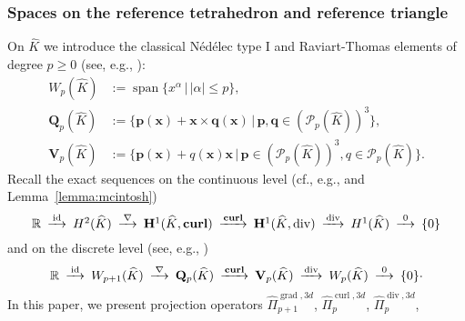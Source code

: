 \documentclass{article}
\newcommand{\hatPicurlcom}{\widehat \Pi^{\operatorname*{curl},3d}_p}
\newcommand{\hatPigradcom}{\widehat\Pi^{\operatorname*{grad},3d}_{p+1}}
\newcommand{\hatPidivcom}{\widehat\Pi^{\operatorname*{div},3d}_{p}}
\begin{document}
\subsubsection{Spaces on the reference tetrahedron and reference triangle}
On $\widehat{K}$ we introduce the classical
N\'{e}d\'{e}lec type I and Raviart-Thomas elements of degree $p\geq0$ (see,
e.g., \cite{Monkbook,hiptmair-acta,nedelec80}):
\begin{align}
W_{p}(\widehat{K}) &  :=\operatorname*{span}\{x^{\alpha
}\,|\,|\alpha|\leq p\},\label{eq:RTp}\\
\mathbf{Q}_{p}(\widehat{K}) &
:=\{\mathbf{p}(\mathbf{x})+\mathbf{x}\times\mathbf{q}(\mathbf{x})\,|\,\mathbf{p},\mathbf{q}%
\in({\mathcal{P}}_{p}(\widehat{K}))^{3}\},\\
\mathbf{V}_{p}(\widehat{K}) &  :=\{\mathbf{p}(\mathbf{x})+{q}(\mathbf{x})\mathbf{x}\,|\,\mathbf{p}%
\in({\mathcal{P}}_{p}(\widehat{K}))^{3},{q}\in{\mathcal{P}}_{p}(\widehat{K}%
)\}.
\end{align}
Recall the exact sequences on the continuous level
(cf., e.g., \cite{costabel-mcintosh10} and Lemma~\ref{lemma:mcintosh})
\begin{align}
\minCDarrowwidth15pt
\begin{CD} \mathbb{R} @> \operatorname*{id} >> H^2(\widehat K) @> \nabla >> \mathbf{H}^1(\widehat K, \operatorname*{\mathbf{curl}}) @> \operatorname*{\mathbf{curl}} >> \mathbf{H}^1(\widehat K, \operatorname*{div}) @> \operatorname*{div} >> H^1(\widehat K) @> \operatorname*{0} >> \{0\} \end{CD}
\end{align}
and on the discrete level (see, e.g., \cite[(57)]{demkowicz08})
\begin{align}
\minCDarrowwidth15pt
\begin{CD} \mathbb{R} @> \operatorname*{id} >> W_{p+1}(\widehat{K}) @> \nabla >> \mathbf{Q}_{p}(\widehat{K}) @> \operatorname*{\mathbf{curl}} >> \mathbf{V}_{p}(\widehat{K}) @> \operatorname*{div} >> W_{p}(\widehat{K}) @> \operatorname*{0} >> \{0\} \end{CD}.
\end{align}
In this paper, we present projection operators $\hatPigradcom$, $\hatPicurlcom$, $\hatPidivcom$,
\end{document}
